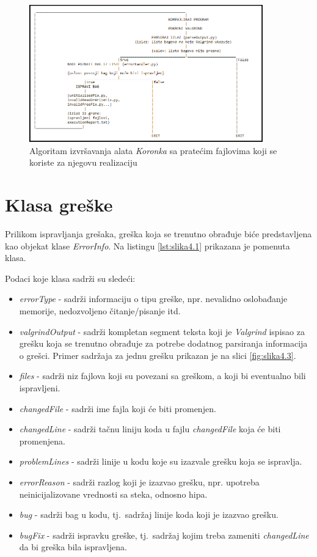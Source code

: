 \documentclass[12pt,oneside]{memoir}
\theoremstyle{plain}
\theoremstyle{definition}
\begin{document}
\begin{figure}[!ht]
  \centering
  \includegraphics[width=0.9\textwidth]{ExecutingAlgorithm.png}
  \caption{Algoritam izvršavanja alata \textit{Koronka} sa pratećim fajlovima koji se koriste za njegovu realizaciju}
  \label{fig:slika4.4}
\end{figure}

\section{Klasa greške}
Prilikom ispravljanja grešaka, greška koja se trenutno obrađuje biće predstavljena kao objekat klase \textit{ErrorInfo}. Na listingu \ref{lst:slika4.1} prikazana je pomenuta klasa.

Podaci koje klasa sadrži su sledeći:
\begin{itemize}
\item \textit{errorType} - sadrži informaciju o tipu greške, npr. nevalidno oslobađanje memorije, nedozvoljeno čitanje/pisanje itd.
\item \textit{valgrindOutput} - sadrži kompletan segment teksta koji je \textit{Valgrind} ispisao za grešku koja se trenutno obrađuje za potrebe dodatnog parsiranja informacija o grešci. Primer sadržaja za jednu grešku prikazan je na slici \ref{fig:slika4.3}.
\item \textit{files} - sadrži niz fajlova koji su povezani sa greškom, a koji bi eventualno bili ispravljeni.
\item \textit{changedFile} - sadrži ime fajla koji će biti promenjen.
\item \textit{changedLine} - sadrži tačnu liniju koda u fajlu \textit{changedFile} koja će biti promenjena.
\item \textit{problemLines} - sadrži linije u kodu koje su izazvale grešku koja se ispravlja.
\item \textit{errorReason} - sadrži razlog koji je izazvao grešku, npr. upotreba neinicijalizovane vrednosti sa steka, odnosno hipa.
\item \textit{bug} - sadrži bag u kodu, tj.~sadržaj linije koda koji je izazvao grešku.
\item \textit{bugFix} - sadrži ispravku greške, tj.~sadržaj kojim treba zameniti \textit{changedLine} da bi greška bila ispravljena.
\end{itemize}
\end{document}
